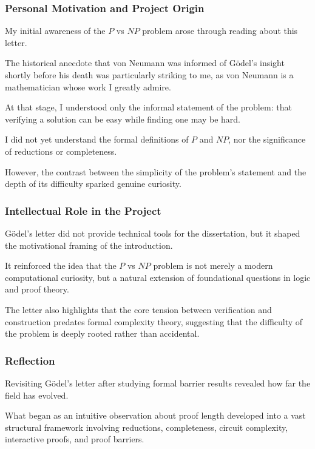 \documentclass[12pt]{article}
\begin{document}
\subsubsection*{Personal Motivation and Project Origin}

My initial awareness of the $P$ vs $NP$ problem arose through reading about this letter.

The historical anecdote that von Neumann was informed of Gödel's insight shortly before his death was particularly striking to me, as von Neumann is a mathematician whose work I greatly admire.

At that stage, I understood only the informal statement of the problem: that verifying a solution can be easy while finding one may be hard.

I did not yet understand the formal definitions of $P$ and $NP$, nor the significance of reductions or completeness.

However, the contrast between the simplicity of the problem's statement and the depth of its difficulty sparked genuine curiosity.

\subsubsection*{Intellectual Role in the Project}

Gödel's letter did not provide technical tools for the dissertation, but it shaped the motivational framing of the introduction.

It reinforced the idea that the $P$ vs $NP$ problem is not merely a modern computational curiosity, but a natural extension of foundational questions in logic and proof theory.

The letter also highlights that the core tension between verification and construction predates formal complexity theory, suggesting that the difficulty of the problem is deeply rooted rather than accidental.

\subsubsection*{Reflection}

Revisiting Gödel's letter after studying formal barrier results revealed how far the field has evolved.

What began as an intuitive observation about proof length developed into a vast structural framework involving reductions, completeness, circuit complexity, interactive proofs, and proof barriers.
\end{document}
